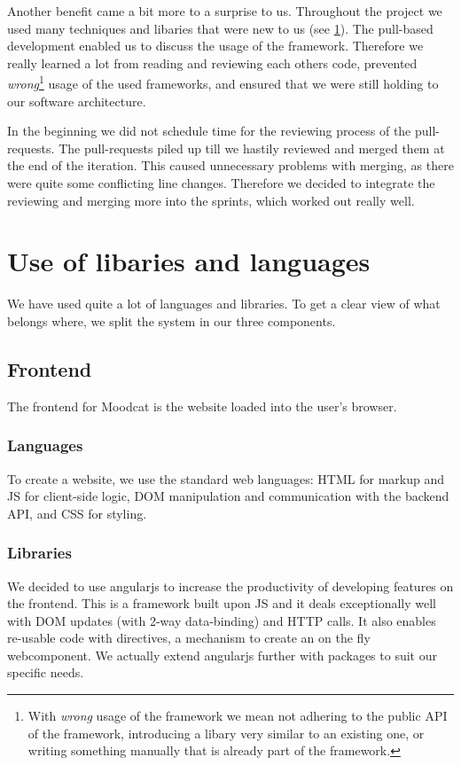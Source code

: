 \par
Another benefit came a bit more to a surprise to us.
Throughout the project we used many techniques and libaries that were new to us (see \ref{reflection-libaries}).
The pull-based development enabled us to discuss the usage of the framework.
Therefore we really learned a lot from reading and reviewing each others code,  prevented \textit{wrong}\footnote{With \textit{wrong} usage of the framework we mean not adhering to the public API of the framework, introducing a libary very similar to an existing one, or writing something manually that is already part of the framework.} usage of the used frameworks, and ensured that we were still holding to our software architecture.

\par
In the beginning we did not schedule time for the reviewing process of the pull-requests.
The pull-requests piled up till we hastily reviewed and merged them at the end of the iteration.
This caused unnecessary problems with merging, as there were quite some conflicting line changes.
Therefore we decided to integrate the reviewing and merging more into the sprints, which worked out really well.

\section{Use of libaries and languages}
\label{reflection-libaries}
We have used quite a lot of languages and libraries.
To get a clear view of what belongs where, we split the system in our three components.

\subsection{Frontend}
The frontend for Moodcat is the website loaded into the user's browser.

\subsubsection{Languages}
To create a website, we use the standard web languages: \gls{HTML} for markup and \gls{JS} for client-side logic, DOM manipulation and communication with the backend API, and \gls{CSS} for styling.

\subsubsection{Libraries}
We decided to use \gls{angularjs} to increase the productivity of developing features on the frontend.
This is a framework built upon \gls{JS} and it deals exceptionally well with DOM updates (with 2-way \gls{data-binding}) and \gls{HTTP} calls.
It also enables re-usable code with directives, a mechanism to create an on the fly webcomponent.
We actually extend \gls{angularjs} further with packages to suit our specific needs.

